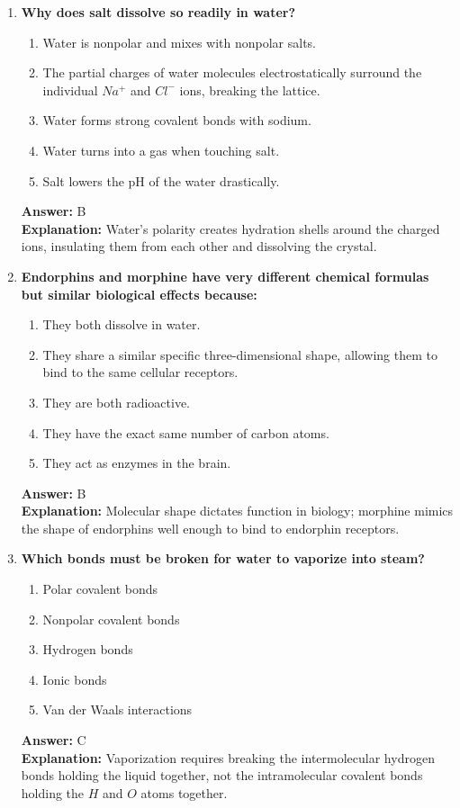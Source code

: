\documentclass[11pt, a4paper]{article}
\begin{document}
\begin{enumerate}
\item \textbf{Why does salt dissolve so readily in water?}
\begin{enumerate}[label=\Alph*.]
    \item Water is nonpolar and mixes with nonpolar salts.
    \item The partial charges of water molecules electrostatically surround the individual $Na^+$ and $Cl^-$ ions, breaking the lattice.
    \item Water forms strong covalent bonds with sodium.
    \item Water turns into a gas when touching salt.
    \item Salt lowers the pH of the water drastically.
\end{enumerate}
\textbf{Answer:} B \\
\textbf{Explanation:} Water's polarity creates hydration shells around the charged ions, insulating them from each other and dissolving the crystal.

\item \textbf{Endorphins and morphine have very different chemical formulas but similar biological effects because:}
\begin{enumerate}[label=\Alph*.]
    \item They both dissolve in water.
    \item They share a similar specific three-dimensional shape, allowing them to bind to the same cellular receptors.
    \item They are both radioactive.
    \item They have the exact same number of carbon atoms.
    \item They act as enzymes in the brain.
\end{enumerate}
\textbf{Answer:} B \\
\textbf{Explanation:} Molecular shape dictates function in biology; morphine mimics the shape of endorphins well enough to bind to endorphin receptors.


\item \textbf{Which bonds must be broken for water to vaporize into steam?}
\begin{enumerate}[label=\Alph*.]
    \item Polar covalent bonds
    \item Nonpolar covalent bonds
    \item Hydrogen bonds
    \item Ionic bonds
    \item Van der Waals interactions
\end{enumerate}
\textbf{Answer:} C \\
\textbf{Explanation:} Vaporization requires breaking the intermolecular hydrogen bonds holding the liquid together, not the intramolecular covalent bonds holding the $H$ and $O$ atoms together.


\end{enumerate}
\end{document}
